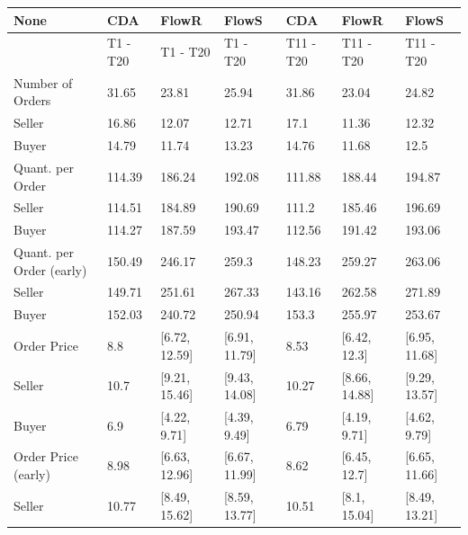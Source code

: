 \documentclass{article}
\begin{document}
\begin{table}[H]
    \centering
\begin{tabular}{lllllll}
\hline
 None                     & CDA      & FlowR         & FlowS         & CDA       & FlowR         & FlowS         \\
\hline
                          & T1 - T20 & T1 - T20      & T1 - T20      & T11 - T20 & T11 - T20     & T11 - T20     \\
 Number of Orders         & 31.65    & 23.81         & 25.94         & 31.86     & 23.04         & 24.82         \\
 Seller                   & 16.86    & 12.07         & 12.71         & 17.1      & 11.36         & 12.32         \\
 Buyer                    & 14.79    & 11.74         & 13.23         & 14.76     & 11.68         & 12.5          \\
 Quant. per Order         & 114.39   & 186.24        & 192.08        & 111.88    & 188.44        & 194.87        \\
 Seller                   & 114.51   & 184.89        & 190.69        & 111.2     & 185.46        & 196.69        \\
 Buyer                    & 114.27   & 187.59        & 193.47        & 112.56    & 191.42        & 193.06        \\
 Quant. per Order (early) & 150.49   & 246.17        & 259.3         & 148.23    & 259.27        & 263.06        \\
 Seller                   & 149.71   & 251.61        & 267.33        & 143.16    & 262.58        & 271.89        \\
 Buyer                    & 152.03   & 240.72        & 250.94        & 153.3     & 255.97        & 253.67        \\
 Order Price              & 8.8      & [6.72, 12.59] & [6.91, 11.79] & 8.53      & [6.42, 12.3]  & [6.95, 11.68] \\
 Seller                   & 10.7     & [9.21, 15.46] & [9.43, 14.08] & 10.27     & [8.66, 14.88] & [9.29, 13.57] \\
 Buyer                    & 6.9      & [4.22, 9.71]  & [4.39, 9.49]  & 6.79      & [4.19, 9.71]  & [4.62, 9.79]  \\
 Order Price (early)      & 8.98     & [6.63, 12.96] & [6.67, 11.99] & 8.62      & [6.45, 12.7]  & [6.65, 11.66] \\
 Seller                   & 10.77    & [8.49, 15.62] & [8.59, 13.77] & 10.51     & [8.1, 15.04]  & [8.49, 13.21] \\

\end{tabular}
\end{table}
\end{document}
